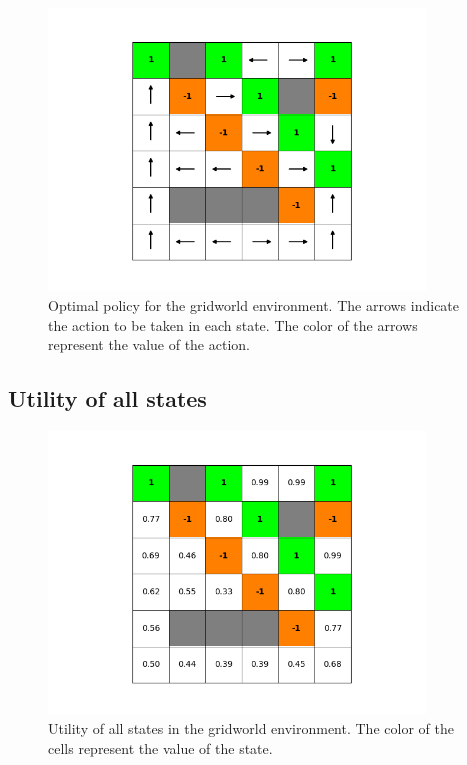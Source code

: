 \documentclass{article}
\begin{document}
\begin{figure}[H]
    \includegraphics[width=100mm]{../asset/policy_iteration_policy.png}
    \caption{Optimal policy for the gridworld environment. The arrows indicate the action to be taken in each state. The color of the arrows represent the value of the action.}
    \label{fig:policy_iteration_policy}
\end{figure}

\subsection{Utility of all states}

\begin{figure}[H]
    \includegraphics[width=100mm]{../asset/policy_iteration_utility.png}
    \caption{Utility of all states in the gridworld environment. The color of the cells represent the value of the state.}
    \label{fig:policy_iteration_utility}
\end{figure}
\end{document}
